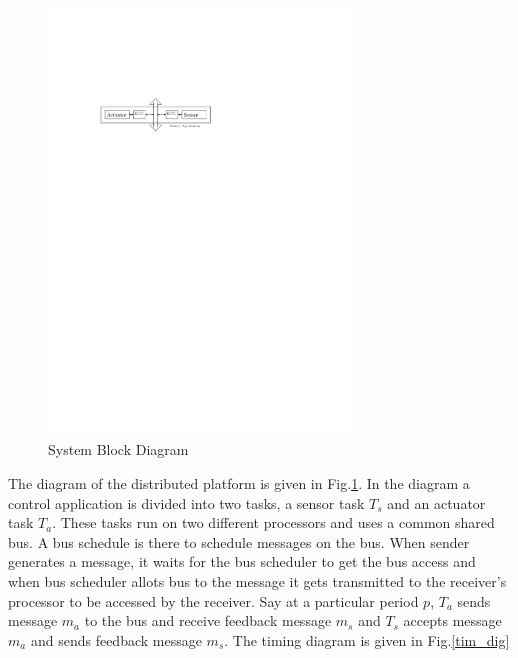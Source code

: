 \begin{figure}
\begin{center}
\includegraphics[width = 80mm]{system_block_diagram.pdf}
\end{center}
\caption{System Block Diagram}
\label{block_dig}
\end{figure}

The diagram of the distributed platform is given in Fig.\ref{block_dig}.
In the diagram a control application is divided into two tasks, a sensor task $T_s$ and 
an actuator task $T_a$. These tasks run on two different processors and
uses a common shared bus. A bus schedule is there to schedule messages on the bus.
When sender generates a message, it waits for the bus scheduler to get the bus
access and when bus scheduler allots bus to the message it gets transmitted to
the receiver's processor to be accessed by the receiver. Say at a particular period  
$p$, $T_a$ sends message $m_a$ to the bus and receive feedback message $m_s$ and $T_s$
accepts message $m_a$ and sends feedback message $m_s$. The timing diagram is given in Fig.\ref{tim_dig}

